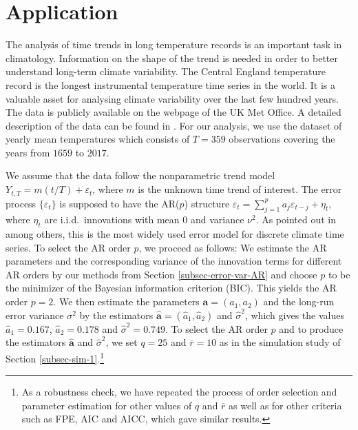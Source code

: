 \begin{enumerate}[label=(\alph*),leftmargin=0.7cm]

\end{enumerate}



\section{Application}\label{sec-data}


The analysis of time trends in long temperature records is an important task in climatology. Information on the shape of the trend is needed in order to better understand long-term climate variability. The Central England temperature record is the longest instrumental temperature time series in the world. It is a valuable asset for analysing climate variability over the last few hundred years. The data is publicly available on the webpage of the UK Met Office. A detailed description of the data can be found in \cite{Parker1992}. For our analysis, we use the dataset of yearly mean temperatures which consists of $T=359$ observations covering the years from $1659$ to $2017$. 


We assume that the data follow the nonparametric trend model $Y_{t,T} = m(t/T) + \varepsilon_t$, where $m$ is the unknown time trend of interest. The error process $\{ \varepsilon_t \}$ is supposed to have the AR($p$) structure $\varepsilon_t = \sum_{j=1}^p a_j \varepsilon_{t-j} + \eta_t$, where $\eta_t$ are i.i.d.\ innovations with mean $0$ and variance $\nu^2$. As pointed out in \cite{Mudelsee2010} among others, this is the most widely used error model for discrete climate time series. To select the AR order $p$, we proceed as follows: We estimate the AR parameters and the corresponding variance of the innovation terms for different AR orders by our methods from Section \ref{subsec-error-var-AR} and choose $p$ to be the minimizer of the Bayesian information criterion (BIC). This yields the AR order $p = 2$. We then estimate the parameters $\boldsymbol{a} = (a_1,a_2)$ and the long-run error variance $\sigma^2$ by the estimators $\widehat{\boldsymbol{a}} = (\widehat{a}_1,\widehat{a}_2)$ and $\widehat{\sigma}^2$, which gives the values  $\widehat{a}_1 = 0.167$, $\widehat{a}_2 = 0.178$ and $\widehat{\sigma}^2 = 0.749$. To select the AR order $p$ and to produce the estimators $\widehat{\boldsymbol{a}}$ and $\widehat{\sigma}^2$, we set $q = 25$ and $\overline{r} = 10$ as in the simulation study of Section \ref{subsec-sim-1}.\footnote{As a robustness check, we have repeated the process of order selection and parameter estimation for other values of $q$ and $\overline{r}$ as well as for other criteria such as FPE, AIC and AICC, which gave similar results.} 


